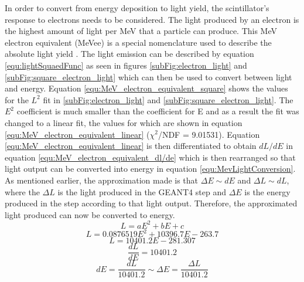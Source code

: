 In order to convert from energy deposition to light yield, the scintillator's response to electrons needs to be considered. The light produced by an electron is the highest amount of light per MeV that a particle can produce. This MeV electron equivalent (MeVee) is a special nomenclature used to describe the absolute light yield \cite{knoll_2010}. The light emission can be described by equation \ref{equ:lightSquaedFunc} as seen in figures \ref{subFig:electron_light} and \ref{subFig:square_electron_light} which can then be used to convert between light and energy. Equation \ref{equ:MeV_electron_equivalent_square} shows the values for the $L^2$ fit in \ref{subFig:electron_light} and \ref{subFig:square_electron_light}. The $E^2$ coefficient is much smaller than the coefficient for E and as a result the fit was changed to a linear fit, the values for which are shown in equation \ref{equ:MeV_electron_equivalent_linear} ($\chi^2$/NDF = 9.01531). Equation \ref{equ:MeV_electron_equivalent_linear} is then differentiated to obtain $dL/dE$ in equation \ref{equ:MeV_electron_equivalent_dl/de} which is then rearranged so that light output can be converted into energy in equation \ref{equ:MevLightConversion}. As mentioned earlier, the approximation made is that $\Delta E \sim dE$ and $\Delta L \sim dL$, where the $\Delta L$ is the light produced in the GEANT4 step and $\Delta E$ is the energy produced in the step according to that light output. Therefore, the approximated light produced can now be converted to energy.
\begin{equation}
    L = aE^2 + bE +c
    \label{equ:lightSquaedFunc}
\end{equation}
\begin{equation}
L = 0.0876519E^2 + 10396.7E - 263.7
\label{equ:MeV_electron_equivalent_square}
\end{equation}
\begin{equation}
L = 10401.2E - 281.307
\label{equ:MeV_electron_equivalent_linear}
\end{equation}
\begin{equation}
\frac{dL}{dE} = 10401.2
\label{equ:MeV_electron_equivalent_dl/de}
\end{equation}
\begin{equation}
dE = \frac{dL}{10401.2} \sim \Delta E = \frac{\Delta L}{10401.2}
\label{equ:MevLightConversion}
\end{equation}

